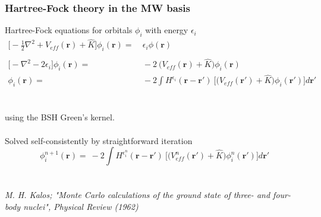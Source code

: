\documentclass[mathserif]{beamer}
\begin{document}
\begin{frame}
    \frametitle{Hartree-Fock theory in the MW basis}
    Hartree-Fock equations for orbitals $\phi_i$ with energy $\epsilon_i$
    \begin{align}
	\nonumber
	\Big[-\frac{1}{2}\nabla^2 + V_{eff}(\boldsymbol{r}) + \hat{K}\Big]
	\phi_i(\boldsymbol{r}) =&\ \epsilon_i \phi(\boldsymbol{r})\\
	\nonumber
	\ & \ \\
	\nonumber
	\Big[-\nabla^2 - 2\epsilon_i\Big]\phi_i(\boldsymbol{r}) =&\ 
	    -2\ \Big(V_{eff}(\boldsymbol{r})+\hat{K}\Big)\phi_i(\boldsymbol{r})\\
	\nonumber
	\phi_i(\boldsymbol{r}) =&\ -2\int H^{\epsilon_i}(\boldsymbol{r}-\boldsymbol{r}')\
	    \Big[\Big(V_{eff}(\boldsymbol{r}') + \hat{K}\Big) 
	    \phi_i(\boldsymbol{r}')\Big] d\boldsymbol{r}'
    \end{align}
    \ \\
    \ \\
    using the BSH Green's kernel.\\
    \ \\
    \pause
    Solved self-consistently by straightforward iteration\\
    \begin{equation}
        \nonumber
        \phi^{n+1}_i(\boldsymbol{r}) =\ 
	    -2\int H^{\epsilon^n_i}(\boldsymbol{r}-\boldsymbol{r}')\ \Big[\Big(V^n_{eff}
	    (\boldsymbol{r}') + \hat{K}\Big) \phi^n_i(\boldsymbol{r}')\Big] 
	    d\boldsymbol{r}'
    \end{equation}
    \ \\
    \ \\
    \tiny \it{M. H. Kalos; "Monte Carlo calculations of the ground state of three- and 
	    four-body nuclei", Physical Review (1962)}
\end{frame}
\end{document}
